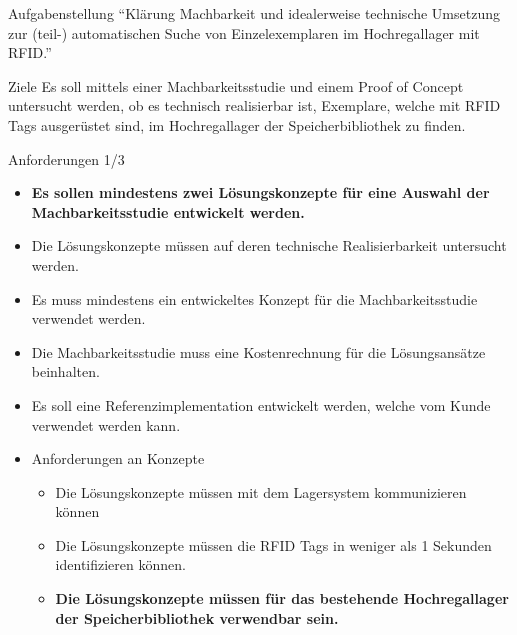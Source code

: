 \documentclass{beamer}
\begin{document}
\begin{frame}{Aufgabenstellung}
\centering
\textquotedblleft Klärung Machbarkeit und idealerweise technische Umsetzung zur (teil-) automatischen Suche von Einzelexemplaren im Hochregallager mit RFID.\textquotedblright
\end{frame}
\begin{frame}{Ziele}
Es soll mittels einer Machbarkeitsstudie und einem Proof of Concept untersucht werden, ob es technisch realisierbar ist, Exemplare, welche mit RFID Tags ausgerüstet sind, im Hochregallager der Speicherbibliothek zu finden.
\end{frame}
\begin{frame}{Anforderungen 1/3}
 \begin{itemize}
    \item \textbf{Es sollen mindestens zwei Lösungskonzepte für eine Auswahl der Machbarkeitsstudie entwickelt werden.}
    \item Die Lösungskonzepte müssen auf deren technische Realisierbarkeit untersucht werden.
    \item Es muss mindestens ein entwickeltes Konzept für die Machbarkeitsstudie verwendet werden.
    \item Die Machbarkeitsstudie muss eine Kostenrechnung für die Lösungsansätze beinhalten.
    \item Es soll eine Referenzimplementation entwickelt werden, welche vom Kunde verwendet werden kann.
    
    \item Anforderungen an Konzepte
    \begin{itemize}
        \item Die Lösungskonzepte müssen mit dem Lagersystem kommunizieren können
        \item Die Lösungskonzepte müssen die RFID Tags in weniger als 1 Sekunden identifizieren können.
        \item \textbf{Die Lösungskonzepte müssen für das bestehende Hochregallager der Speicherbibliothek verwendbar sein.}
    \end{itemize}
\end{itemize}
\end{frame}
\end{document}
